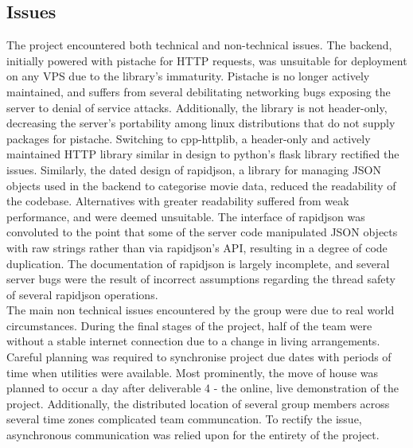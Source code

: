 \documentclass{article}
\begin{document}
\subsection{Issues}
The project encountered both technical and non-technical issues. The backend,
initially powered with pistache for HTTP requests, was unsuitable for
deployment on any VPS due to the library's immaturity. Pistache is no longer
actively maintained, and suffers from several debilitating networking bugs
exposing the server to denial of service attacks. Additionally, the library is
not header-only, decreasing the server's portability among linux distributions
that do not supply packages for pistache. Switching to cpp-httplib, a
header-only and actively maintained HTTP library similar in design to python's
flask library rectified the issues. Similarly, the dated design of rapidjson, a
library for managing JSON objects used in the backend to categorise movie data,
reduced the readability of the codebase. Alternatives with greater readability
suffered from weak performance, and were deemed unsuitable. The interface of
rapidjson was convoluted to the point that some of the server code manipulated
JSON objects with raw strings rather than via rapidjson's API, resulting in
a degree of code duplication. The documentation of rapidjson is largely
incomplete, and several server bugs were the result of incorrect assumptions
regarding the thread safety of several rapidjson operations.\\
The main non technical issues encountered by the group were due to real world
circumstances. During the final stages of the project, half of the team were
without a stable internet connection due to a change in living arrangements.
Careful planning was required to synchronise project due dates with periods
of time when utilities were available. Most prominently, the move of house
was planned to occur a day after deliverable 4 - the online, live demonstration
of the project. Additionally, the distributed location of several group members
across several time zones complicated team communcation. To rectify the issue,
asynchronous communication was relied upon for the entirety of the project.
 
\end{document}

